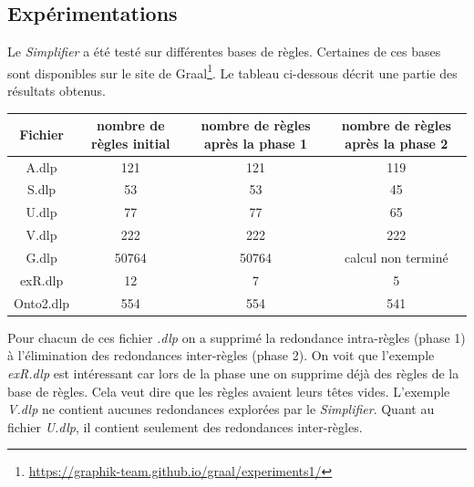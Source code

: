          
\subsection{Expérimentations}

\par Le \textit{Simplifier} a été testé sur différentes bases de règles. 
Certaines de ces bases sont disponibles sur le site de Graal\footnote{\url{https://graphik-team.github.io/graal/experiments1/}}. Le tableau ci-dessous décrit une partie des résultats obtenus.
\begin{center}
\begin{tabular}{|c||c|c|c|}
    \hline
    Fichier & nombre de règles initial & nombre de règles après la phase 1 & nombre de règles après la phase 2 \\
    \hline
     \hline
       A.dlp & 121 & 121 & 119    \\
     \hline
       S.dlp & 53  & 53 & 45      \\
     \hline
       U.dlp & 77  & 77 & 65      \\
     \hline
       V.dlp & 222 & 222 & 222    \\
      \hline
       G.dlp & 50764 & 50764 & calcul non terminé \\
     \hline
       exR.dlp & 12 & 7 & 5 	\\
     \hline
       Onto2.dlp & 554 & 554 & 541	\\
     \hline
\end{tabular}
\end{center}

\par Pour chacun de ces fichier \textit{.dlp} on a supprimé la redondance intra-règles (phase 1) à l'élimination des redondances inter-règles (phase 2). On voit que l'exemple \textit{exR.dlp} est intéressant car lors de la phase une on supprime déjà des règles de la base de règles. Cela veut dire que les règles avaient leurs têtes vides. L'exemple \textit{V.dlp} ne contient aucunes redondances explorées par le \textit{Simplifier}. Quant au fichier \textit{U.dlp}, il contient seulement des redondances inter-règles.  
